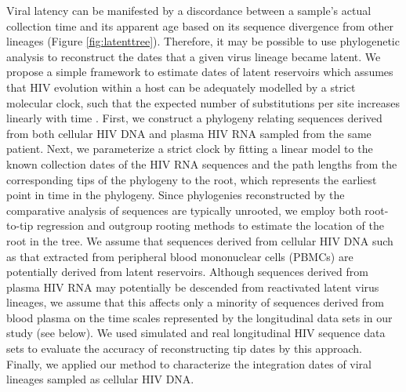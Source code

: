 \documentclass[12pt]{article}
\begin{document}
Viral latency can be manifested by a discordance between a sample's actual collection time and its apparent age based on its sequence divergence from other lineages (Figure \ref{fig:latenttree}). 
Therefore, it may be possible to use phylogenetic analysis to reconstruct the dates that a given virus lineage became latent.
We propose a simple framework to estimate dates of latent reservoirs which assumes that HIV evolution within a host can be adequately modelled by a strict molecular clock, such that the expected number of substitutions per site increases linearly with time \citep{Ho14}. 
First, we construct a phylogeny relating sequences derived from both cellular HIV DNA and plasma HIV RNA sampled from the same patient.
Next, we parameterize a strict clock by fitting a linear model to the known collection dates of the HIV RNA sequences and the path lengths from the corresponding tips of the phylogeny to the root, which represents the earliest point in time in the phylogeny. 
Since phylogenies reconstructed by the comparative analysis of sequences are typically unrooted, we employ both root-to-tip regression \citep{Korber00} and outgroup rooting methods to estimate the location of the root in the tree. 
We assume that sequences derived from cellular HIV DNA such as that extracted from peripheral blood mononuclear cells (PBMCs) are potentially derived from latent reservoirs. %
Although sequences derived from plasma HIV RNA may potentially be descended from reactivated latent virus lineages, we assume that this affects only a minority of sequences derived from blood plasma on the time scales represented by the longitudinal data sets in our study (see below).
We used simulated and real longitudinal HIV sequence data sets to evaluate the accuracy of reconstructing tip dates by this approach.
Finally, we applied our method to characterize the integration dates of viral lineages sampled as cellular HIV DNA.

%
\end{document}
